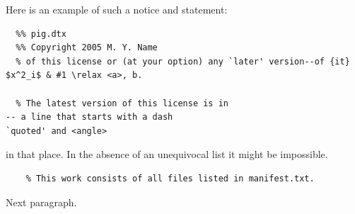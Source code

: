 \documentclass{article}
\begin{document}
Here is an example of such a notice and statement:
\begin{verbatim}
  %% pig.dtx
  %% Copyright 2005 M. Y. Name
  % of this license or (at your option) any `later' version--of {it} $x^2_i$ & #1 \relax <a>, b.

  % The latest version of this license is in
-- a line that starts with a dash
`quoted' and <angle>
\end{verbatim}
  in that place.  In the absence of an unequivocal list it might be
  impossible.

\begin{verbatim}
    % This work consists of all files listed in manifest.txt.
\end{verbatim}

Next paragraph.
\end{document}
